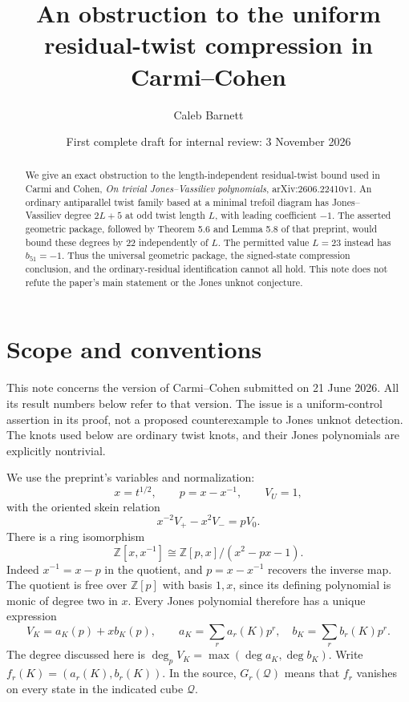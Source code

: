 \documentclass[11pt]{amsart}
\title[Uniform residual-twist compression]{An obstruction to the uniform residual-twist compression in Carmi--Cohen}
\author{Caleb Barnett}
\date{First complete draft for internal review: 3 November 2026}
\theoremstyle{remark}
\newcommand{\Z}{\mathbb Z}
\newcommand{\degp}{\deg_p}
\begin{document}
\begin{abstract}
We give an exact obstruction to the length-independent residual-twist
bound used in Carmi and Cohen, \emph{On trivial Jones--Vassiliev
polynomials}, arXiv:2606.22410v1. An ordinary antiparallel twist family
based at a minimal trefoil diagram has Jones--Vassiliev degree \(2L+5\)
at odd twist length \(L\), with leading coefficient \(-1\).
The asserted geometric package, followed by Theorem 5.6 and Lemma 5.8
of that preprint, would bound these degrees by \(22\) independently
of \(L\). The permitted value \(L=23\) instead has \(b_{51}=-1\).
Thus the universal geometric package, the signed-state compression
conclusion, and the ordinary-residual identification cannot all hold.
This note does not refute the paper's main
statement or the Jones unknot conjecture.
\end{abstract}
\maketitle

\section{Scope and conventions}

This note concerns the version of Carmi--Cohen \cite{CC} submitted on
21 June 2026. All its result numbers below refer to that version.
The issue is a uniform-control assertion in its proof, not a proposed
counterexample to Jones unknot detection. The knots used below are
ordinary twist knots, and their Jones polynomials are explicitly
nontrivial.

We use the preprint's variables and normalization:
\[
 x=t^{1/2},\qquad p=x-x^{-1},\qquad V_U=1,
\]
with the oriented skein relation
\begin{equation}\label{eq:skein}
 x^{-2}V_+-x^2V_-=pV_0.
\end{equation}
There is a ring isomorphism
\begin{equation}\label{eq:ring}
 \Z[x,x^{-1}]\cong\Z[p,x]/(x^2-px-1).
\end{equation}
Indeed \(x^{-1}=x-p\) in the quotient, and \(p=x-x^{-1}\)
recovers the inverse map. The quotient is free over \(\Z[p]\)
with basis \(1,x\), since its defining polynomial is monic of
degree two in \(x\). Every Jones polynomial therefore has a
unique expression
\begin{equation}\label{eq:jvp}
 V_K=a_K(p)+x b_K(p),\qquad
 a_K=\sum_r a_r(K)p^r,\quad b_K=\sum_r b_r(K)p^r.
\end{equation}
The degree discussed here is
\(\degp V_K=\max(\deg a_K,\deg b_K)\).
Write \(f_r(K)=(a_r(K),b_r(K))\). In the source,
\(G_r(\mathcal Q)\) means that \(f_r\) vanishes on every
state in the indicated cube \(\mathcal Q\).
\end{document}
